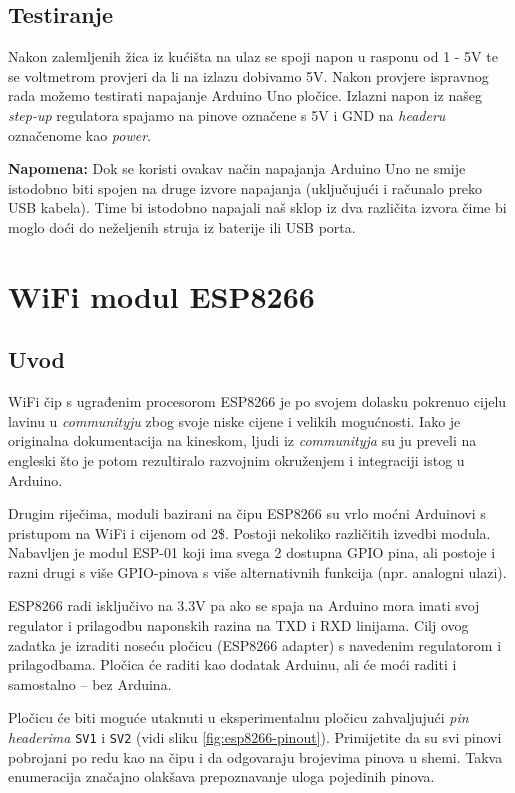 \documentclass[times, utf8, zavrsni, numeric, sort]{fer}
\begin{document}
\section{Testiranje}
Nakon zalemljenih žica iz kućišta na ulaz se spoji napon u rasponu od 1 - 5V te se voltmetrom provjeri da li na izlazu dobivamo 5V. Nakon provjere ispravnog rada možemo testirati napajanje Arduino Uno pločice. Izlazni napon iz našeg \textit{step-up} regulatora spajamo na pinove označene s 5V i GND na \textit{headeru} označenome kao \textit{power}.

\textbf{Napomena:} Dok se koristi ovakav način napajanja Arduino Uno ne smije istodobno biti spojen na druge izvore napajanja (uključujući i računalo preko USB kabela). Time bi istodobno napajali naš sklop iz dva različita izvora čime bi moglo doći do neželjenih struja iz baterije ili USB porta.

\chapter{WiFi modul ESP8266}
\section{Uvod}

WiFi čip s ugrađenim procesorom ESP8266 je po svojem dolasku pokrenuo cijelu lavinu u \textit{communityju} zbog svoje niske cijene i velikih mogućnosti. Iako je originalna dokumentacija na kineskom, ljudi iz \textit{communityja} su ju preveli na engleski što je potom rezultiralo razvojnim okruženjem i integraciji istog u Arduino.

Drugim riječima, moduli bazirani na čipu ESP8266 su vrlo moćni Arduinovi s pristupom na WiFi i cijenom od 2\$. Postoji nekoliko različitih izvedbi modula. Nabavljen je modul ESP-01 koji ima svega 2 dostupna GPIO pina, ali postoje i razni drugi s više GPIO-pinova s više alternativnih funkcija (npr. analogni ulazi).

ESP8266 radi isključivo na 3.3V pa ako se spaja na Arduino mora imati svoj regulator i prilagodbu naponskih razina na TXD i RXD linijama. Cilj ovog zadatka je izraditi noseću pločicu (ESP8266 adapter) s navedenim regulatorom i prilagodbama. Pločica će raditi kao dodatak Arduinu, ali će moći raditi i samostalno -- bez Arduina.

Pločicu će biti moguće utaknuti u eksperimentalnu pločicu zahvaljujući \textit{pin headerima} \texttt{SV1} i \texttt{SV2} (vidi sliku \ref{fig:esp8266-pinout}). Primijetite da su svi pinovi pobrojani po redu kao na čipu i da odgovaraju brojevima pinova u shemi. Takva enumeracija značajno olakšava prepoznavanje uloga pojedinih pinova.
\end{document}
